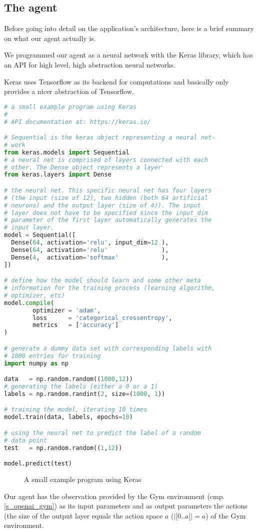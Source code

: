 \subsection{The agent}

Before going into detail on the application's architecture,
here is a brief summary on what our agent actually is.

We programmed our agent as a neural network with the Keras
library, which has an API for high level, high abstraction
neural networks.

Keras uses Tensorflow as its backend for computations and
basically only provides a nicer abstraction of Tensorflow.

\begin{mdframed}[style=codebox]
\begin{lstlisting}[language=Python]
# a small example program using Keras
#
# API documentation at: https://keras.io/

# Sequential is the keras object representing a neural net-
# work
from keras.models import Sequential
# a neural net is comprised of layers connected with each
# other. The Dense object represents a layer
from keras.layers import Dense

# the neural net. This specific neural net has four layers
# (the input (size of 12), two hidden (both 64 artificial
# neurons) and the output layer (size of 4)). The input
# layer does not have to be specified since the input_dim
# parameter of the first layer automatically generates the
# input layer.
model = Sequential([
  Dense(64, activation='relu', input_dim=12 ),
  Dense(64, activation='relu'               ),
  Dense(4,  activation='softmax'            ),
])

# define how the model should learn and some other meta
# information for the training process (learning algorithm,
# optimizer, etc)
model.compile(
        optimizer = 'adam',
        loss      = 'categorical_crossentropy',
        metrics   = ['accuracy']
)

# generate a dummy data set with corresponding labels with
# 1000 entries for training
import numpy as np

data   = np.random.random((1000,12))
# generating the labels (either a 0 or a 1)
labels = np.random.randint(2, size=(1000, 1))

# training the model, iterating 10 times
model.train(data, labels, epochs=10)

# using the neural net to predict the label of a random
# data point
test   = np.random.random((1,12))

model.predict(test)
\end{lstlisting}
\end{mdframed}
\begin{figure}[H]
\caption{A small example program using Keras}
\end{figure}

Our agent has the observation provided by the Gym
environment (cmp. \ref{s_openai_gym}) as its input
parameters and as output parameters the actions (the size
of the output layer equals the action space $a$
($|[0..a[| = a$) of the Gym environment.

